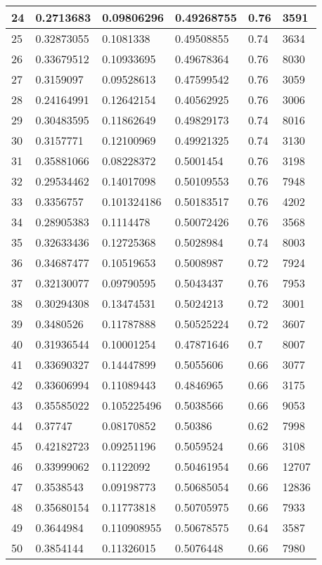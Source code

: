 \begin{longtable}{|l|l|l|l|l|l|}
24 & 0.2713683 & 0.09806296 & 0.49268755 & 0.76 & 3591 \\ \hline 
25 & 0.32873055 & 0.1081338 & 0.49508855 & 0.74 & 3634 \\ \hline 
26 & 0.33679512 & 0.10933695 & 0.49678364 & 0.76 & 8030 \\ \hline 
27 & 0.3159097 & 0.09528613 & 0.47599542 & 0.76 & 3059 \\ \hline 
28 & 0.24164991 & 0.12642154 & 0.40562925 & 0.76 & 3006 \\ \hline 
29 & 0.30483595 & 0.11862649 & 0.49829173 & 0.74 & 8016 \\ \hline 
30 & 0.3157771 & 0.12100969 & 0.49921325 & 0.74 & 3130 \\ \hline 
31 & 0.35881066 & 0.08228372 & 0.5001454 & 0.76 & 3198 \\ \hline 
32 & 0.29534462 & 0.14017098 & 0.50109553 & 0.76 & 7948 \\ \hline 
33 & 0.3356757 & 0.101324186 & 0.50183517 & 0.76 & 4202 \\ \hline 
34 & 0.28905383 & 0.1114478 & 0.50072426 & 0.76 & 3568 \\ \hline 
35 & 0.32633436 & 0.12725368 & 0.5028984 & 0.74 & 8003 \\ \hline 
36 & 0.34687477 & 0.10519653 & 0.5008987 & 0.72 & 7924 \\ \hline 
37 & 0.32130077 & 0.09790595 & 0.5043437 & 0.76 & 7953 \\ \hline 
38 & 0.30294308 & 0.13474531 & 0.5024213 & 0.72 & 3001 \\ \hline 
39 & 0.3480526 & 0.11787888 & 0.50525224 & 0.72 & 3607 \\ \hline 
40 & 0.31936544 & 0.10001254 & 0.47871646 & 0.7 & 8007 \\ \hline 
41 & 0.33690327 & 0.14447899 & 0.5055606 & 0.66 & 3077 \\ \hline 
42 & 0.33606994 & 0.11089443 & 0.4846965 & 0.66 & 3175 \\ \hline 
43 & 0.35585022 & 0.105225496 & 0.5038566 & 0.66 & 9053 \\ \hline 
44 & 0.37747 & 0.08170852 & 0.50386 & 0.62 & 7998 \\ \hline 
45 & 0.42182723 & 0.09251196 & 0.5059524 & 0.66 & 3108 \\ \hline 
46 & 0.33999062 & 0.1122092 & 0.50461954 & 0.66 & 12707 \\ \hline 
47 & 0.3538543 & 0.09198773 & 0.50685054 & 0.66 & 12836 \\ \hline 
48 & 0.35680154 & 0.11773818 & 0.50705975 & 0.66 & 7933 \\ \hline 
49 & 0.3644984 & 0.110908955 & 0.50678575 & 0.64 & 3587 \\ \hline 
50 & 0.3854144 & 0.11326015 & 0.5076448 & 0.66 & 7980 \\ \hline 
\end{longtable}